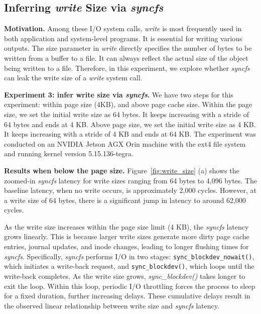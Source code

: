  














\subsection{Inferring \textit{write} Size via \textit{syncfs}}
\label{sec:re_2}

\textbf{Motivation.} Among these I/O system calls, \textit{write} is most frequently used in both application and system-level programs. It is essential for writing various outputs. The size parameter in \textit{write} directly specifies the number of bytes to be written from a buffer to a file. It can always reflect the actual size of the object being written to a file.  Therefore, in this experiment, we explore whether \textit{syncfs} can leak the write size of a \textit{write} system call. 


 





 \textbf{Experiment 3: infer write size via \textit{syncfs}.} We have two steps for this experiment: within page size (4KB), and above page cache size. Within the page size, we set the initial write size as 64 bytes. It keeps increasing with a stride of 64 bytes and ends at 4 KB. Above page size, we set the initial write size as 4 KB. It keeps increasing with a stride of 4 KB and ends at 64 KB. The experiment was conducted on an NVIDIA Jetson AGX Orin machine with the ext4 file system and running kernel version 5.15.136-tegra.









 \textbf{Results when below the page size.} Figure~\ref{fig:write_size} (a) shows the zoomed-in \textit{syncfs} latency for write sizes ranging from 64 bytes to 4,096 bytes. The baseline latency, when no write occurs, is approximately 2,000 cycles. However, at a write size of 64 bytes, there is a significant jump in latency to around 62,000 cycles. 


As the write size increases within the page size limit (4 KB), the \textit{syncfs} latency grows linearly. This is because larger write sizes generate more dirty page cache entries, journal updates, and inode changes, leading to longer flushing times for \textit{syncfs}. Specifically, \textit{syncfs} performs I/O in two stages: \texttt{sync\_blockdev\_nowait()}, which initiates a write-back request, and \texttt{sync\_blockdev()}, which loops until the write-back completes. As the write size grows, \textit{sync\_blockdev()} takes longer to exit the loop. Within this loop, periodic I/O throttling forces the process to sleep for a fixed duration, further increasing delays. These cumulative delays result in the observed linear relationship between write size and \textit{syncfs} latency.

